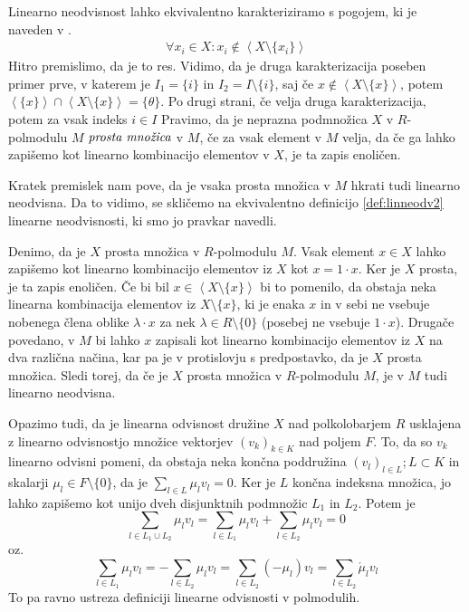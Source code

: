\documentclass[mat1]{fmfdelo}
\newcommand{\pojem}[1]{\ensuremath{\emph{#1}}}
\newcommand{\Gen}[1]{\ensuremath{\left<{#1}\right>}}
\begin{document}
Linearno neodvisnost lahko ekvivalentno karakteriziramo s pogojem, ki je naveden v \cite[definicija 2.\,3.\,]{bib:Tanbase}. \begin{align}\label{def:linneodv2}
	\forall x_i\in X: x_i \notin \Gen{X\setminus\{x_i\}}
\end{align}
Hitro premislimo, da je to res. Vidimo, da je druga karakterizacija poseben primer prve, v katerem je $I_1 = \{i\}$ in $I_2 = I\setminus\{i\}$, saj če $x\notin \Gen{X\setminus\{x\}}$, potem $\Gen{\{x\}}\cap \Gen{X\setminus\{x\}} = \{\theta\}$. Po drugi strani, če velja druga karakterizacija, potem za vsak indeks $i\in I$ 
Pravimo, da je neprazna podmnožica $X$ v $R$-polmodulu $M$ \pojem{prosta množica} v $M$, če za vsak element v $M$ velja, da če ga lahko zapišemo kot linearno kombinacijo elementov v $X$, je ta zapis enoličen. 

Kratek premislek nam pove, da je vsaka prosta množica v $M$ hkrati tudi linearno neodvisna. Da to vidimo, se skličemo na ekvivalentno definicijo \ref{def:linneodv2} linearne neodvisnosti, ki smo jo pravkar navedli.

Denimo, da je $X$ prosta množica v $R$-polmodulu $M$. Vsak element $x\in X$ lahko zapišemo kot linearno kombinacijo elementov iz $X$ kot $x = 1\cdot x$. Ker je $X$ prosta, je ta zapis enoličen. Če bi bil $x \in\Gen{X\setminus\{x\}}$ bi to pomenilo, da obstaja neka linearna kombinacija elementov iz $X\setminus\{x\}$, ki je enaka $x$ in v sebi ne vsebuje nobenega člena oblike $\lambda\cdot x$ za nek $\lambda\in R\setminus\{0\}$ (posebej ne vsebuje $1\cdot x$). Drugače povedano, v $M$ bi lahko $x$ zapisali kot linearno kombinacijo elementov iz $X$ na dva različna načina, kar pa je v protislovju s predpostavko, da je $X$ prosta množica. Sledi torej, da če je $X$ prosta množica v $R$-polmodulu $M$, je v $M$ tudi linearno neodvisna.

Opazimo tudi, da je linearna odvisnost družine $X$ nad polkolobarjem $R$ usklajena z linearno odvisnostjo množice vektorjev $(v_k)_{k\in K}$ nad poljem $F$.
To, da so $v_k$ linearno odvisni pomeni, da obstaja neka končna poddružina $(v_l)_{l\in L}; L\subset K$ in skalarji $\mu_l\in F\setminus\{0\}$, da je $\sum_{l\in L}\mu_lv_l = 0$. Ker je $L$ končna indeksna množica, jo lahko zapišemo kot unijo dveh disjunktnih podmnožic $L_1$ in $L_2$. Potem je $$ \sum_{l\in L_1\cup L_2} \mu_lv_l = \sum_{l\in L_1}\mu_lv_l + \sum_{l\in L_2}\mu_lv_l = 0$$ oz. $$\sum_{l\in L_1}\mu_lv_l = - \sum_{l\in L_2}\mu_lv_l = \sum_{l\in L_2} (-\mu_l)v_l = \sum_{l\in L_2}\acute{\mu}_lv_l $$
To pa ravno ustreza definiciji linearne odvisnosti v polmodulih. 
\end{document}
